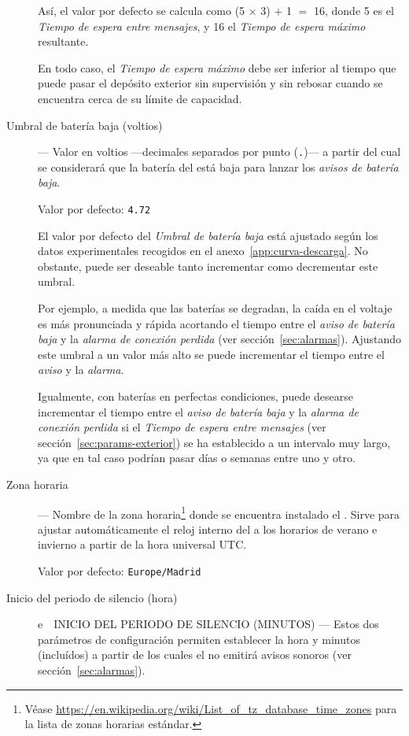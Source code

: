 \begin{description}
  Así, el valor por defecto se calcula como (5 $\times$ 3) $+$ 1 $=$ 16, donde 5 es el \emph{Tiempo de espera entre mensajes}, y 16 el \emph{Tiempo de espera máximo} resultante.
  
  En todo caso, el \emph{Tiempo de espera máximo} debe ser inferior al tiempo que puede pasar el depósito exterior sin supervisión y sin rebosar cuando se encuentra cerca de su límite de capacidad.
  \tipend
  
  
  \item[Umbral de batería baja (voltios)] --- Valor en voltios ---decimales separados por punto (\texttt{.})--- a partir del cual se considerará que la batería del \MEE está baja para lanzar los \emph{avisos de batería baja}.
  
  Valor por defecto: \texttt{4.72}
  
  El valor por defecto del \emph{Umbral de batería baja} está ajustado según los datos experimentales recogidos en el anexo~\ref{app:curva-descarga}. No obstante, puede ser deseable tanto incrementar como decrementar este umbral.
  
  Por ejemplo, a medida que las baterías se degradan, la caída en el voltaje es más pronunciada y rápida acortando el tiempo entre el \emph{aviso de batería baja} y la \emph{alarma de conexión perdida} (ver sección~\ref{sec:alarmas}). Ajustando este umbral a un valor más alto se puede incrementar el tiempo entre el \emph{aviso} y la \emph{alarma}.
  
  Igualmente, con baterías en perfectas condiciones, puede desearse incrementar el tiempo entre el \emph{aviso de batería baja} y la \emph{alarma de conexión perdida} si el \emph{Tiempo de espera entre mensajes} (ver sección~\ref{sec:params-exterior}) se ha establecido a un intervalo muy largo, ya que en tal caso podrían pasar días o semanas entre uno y otro.
  \tipend
  
  \item[Zona horaria] --- Nombre de la zona horaria\footnote{Véase \url{https://en.wikipedia.org/wiki/List_of_tz_database_time_zones} para la lista de zonas horarias estándar.} donde se encuentra instalado el \CMS. Sirve para ajustar automáticamente el reloj interno del \MEE a los horarios de verano e invierno a partir de la hora universal UTC.
  
  Valor por defecto: \texttt{Europe/Madrid}
  
  \item[Inicio del periodo de silencio (hora)] e~~{\color{main}\uppercase{Inicio del periodo de silencio (minutos)}} --- Estos dos parámetros de configuración permiten establecer la hora y minutos (incluídos) a partir de los cuales el \CMS no emitirá avisos sonoros (ver sección~\ref{sec:alarmas}). 
  

\end{description}
